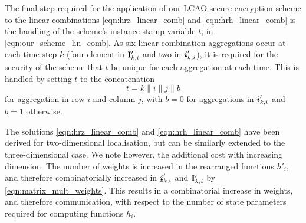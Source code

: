 \documentclass[twocolumn]{autart}
\begin{document}
The final step required for the application of our LCAO-secure encryption scheme to the linear combinations \eqref{eqn:hrz_linear_comb} and \eqref{eqn:hrh_linear_comb} is the handling of the scheme's instance-stamp variable $t$, in \eqref{eqn:our_scheme_lin_comb}. As six linear-combination aggregations occur at each time step $k$ (four element in ${{\mathbf{I}}}'_{k,i}$ and two in ${\boldsymbol{\underline{i}}}'_{k,i}$), it is required for the security of the scheme that $t$ be unique for each aggregation at each time. This is handled by setting $t$ to the concatenation 
\begin{equation}
    t=k\mathbin\|i\mathbin\|j\mathbin\|b
\end{equation}
for aggregation in row $i$ and column $j$, with $b=0$ for aggregations in ${\boldsymbol{\underline{i}}}'_{k,i}$ and $b=1$ otherwise.
\begin{rem}
    The solutions \eqref{eqn:hrz_linear_comb} and \eqref{eqn:hrh_linear_comb} have been derived for two-dimensional localisation, but can be similarly extended to the three-dimensional case. We note however, the additional cost with increasing dimension. The number of weights is increased in the rearranged functions $h'_i$, and therefore combinatorially increased in ${\boldsymbol{\underline{i}}}'_{k,i}$ and ${{\mathbf{I}}}'_{k,i}$ by \eqref{eqn:matrix_mult_weights}. This results in a combinatorial increase in weights, and therefore communication, with respect to the number of state parameters required for computing functions $h_i$.
\end{rem}

% 
% 
\end{document}

